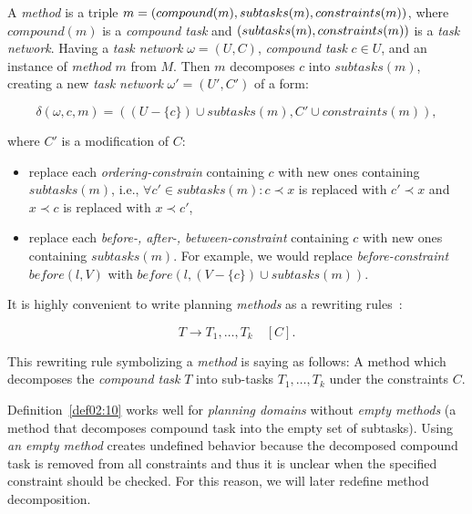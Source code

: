 \begin{defn}\label{def02:10}
    A \emph{method} is a triple $m = (compound(m),subtasks(m), \\ constraints(m))$, where $compound(m)$ is a \emph{compound  task} and $(subtasks(m), \\ constraints(m))$ is a \emph{task network}. Having a \emph{task network} $\omega=(U,C)$, \emph{compound task} $c \in U$, and an instance of \emph{method} $m$ from $M$. Then $m$ decomposes $c$ into $subtasks(m)$, creating a new \emph{task network} $\omega'=(U',C')$ of a form:

    \[
    \delta(\omega,c,m) = ((U-\{c\}) \cup subtasks(m), C' \cup constraints(m)),
    \]

    \noindent
    where $C'$ is a modification of $C$:

    \begin{itemize}
        \item replace each \emph{ordering-constrain} containing $c$ with new ones containing $subtasks(m)$, i.e., $\forall c' \in subtasks(m): c \prec x$ is replaced with $c' \prec x$ and $x \prec c$ is replaced with $x \prec c'$,
        
        \item replace each \emph{before-, after-, between-constraint} containing $c$ with new ones containing $subtasks(m)$. For example, we would replace \emph{before-constraint} $before(l,V)$ with $before(l,(V - \{c\}) \cup subtasks(m))$.
    \end{itemize}
\end{defn}

\medbreak\noindent
It is highly convenient to write planning \emph{methods} as a rewriting rules~\cite{ondrckova2023semantics}:

\[
T \rightarrow T_1,\dots,T_k \quad [C].
\]

\noindent
This rewriting rule symbolizing a \emph{method} is saying as follows: A method which decomposes the \emph{compound task} $T$ into sub-tasks $T_1,\dots,T_k$ under the constraints $C$.

\medbreak\noindent
Definition~\ref{def02:10} works well for \emph{planning domains} without \emph{empty methods} (a method that decomposes compound task into the empty set of subtasks). Using \emph{an empty method} creates undefined behavior because the decomposed compound task is removed from all constraints and thus it is unclear when the specified constraint should be checked. For this reason, we will later redefine method decomposition. 

